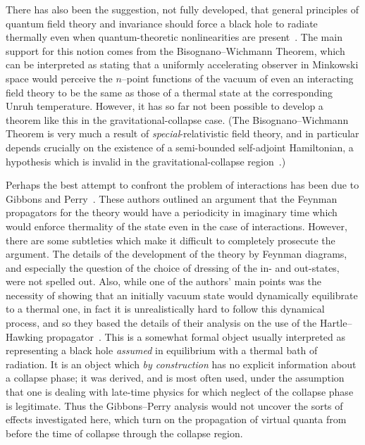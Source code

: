 \documentclass[11pt]{article}
\begin{document}
There has  also been the suggestion, not fully developed, that general
principles of quantum field theory and invariance should force a black hole to
radiate thermally even when quantum-theoretic nonlinearities are
present~\cite{Wald:1994}.  The main support for this notion comes from  the
Bisognano--Wichmann Theorem, which can be interpreted as stating that a
uniformly accelerating observer in Minkowski space would perceive the
$n$--point functions of the vacuum of even an interacting field theory to be
the same as those of a thermal state at the corresponding Unruh temperature.
However, it has so far not been possible to develop a theorem like this in the
gravitational-collapse case.  (The Bisognano--Wichmann Theorem is very much a
result of {\em special}-relativistic field theory, and in particular depends
crucially on the existence of a semi-bounded self-adjoint Hamiltonian, a
hypothesis which is invalid in the gravitational-collapse
region~\cite{Helfer:1996}.)   

Perhaps the best attempt to confront the problem of interactions has been due
to Gibbons and Perry~\cite{GP:1976}.  These authors  outlined an argument that
the Feynman propagators for the theory would have a periodicity in imaginary
time which would enforce thermality of the state even in the case of
interactions.  However, there are some subtleties which make it difficult to
completely prosecute the argument.  The details of the development of the
theory by Feynman diagrams, and especially the question of the choice of
dressing of the in- and out-states, were not spelled out.  Also, while one of
the authors' main points was the necessity of showing that an initially vacuum
state would dynamically equilibrate to a thermal one, in fact it is
unrealistically hard to follow this dynamical process, and so they based the
details of their analysis on the use of the Hartle--Hawking
propagator~\cite{HH:1976}.   This is a somewhat formal object usually
interpreted as representing a black hole {\em assumed} in equilibrium with a
thermal bath of radiation.    It is an object which {\em by construction} has
no explicit information about a collapse phase; it  was derived, and is most
often used, under the assumption that  one is dealing with late-time physics
for which neglect of the collapse  phase is legitimate.  Thus the
Gibbons--Perry analysis would not uncover the sorts of effects investigated
here, which turn on the propagation of virtual quanta from before the time of
collapse through the collapse region.
\end{document}
